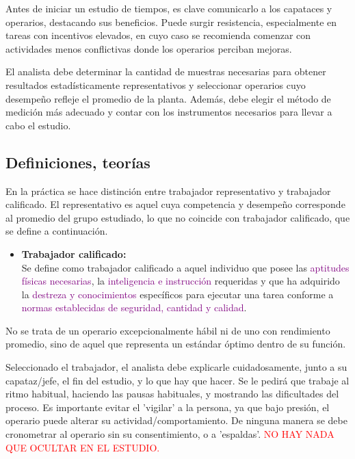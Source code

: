 \documentclass[a4paper,oneside,11pt]{article}
\begin{document}
Antes de iniciar un estudio de tiempos, es clave comunicarlo a los capataces y operarios, destacando sus beneficios. Puede surgir resistencia, especialmente en tareas con incentivos elevados, en cuyo caso se recomienda comenzar con actividades menos conflictivas donde los operarios perciban mejoras.  

El analista debe determinar la cantidad de muestras necesarias para obtener resultados estadísticamente representativos y seleccionar operarios cuyo desempeño refleje el promedio de la planta. Además, debe elegir el método de medición más adecuado y contar con los instrumentos necesarios para llevar a cabo el estudio.

\subsection{Definiciones, teorías}

En la práctica se hace distinción entre trabajador representativo y trabajador calificado. El representativo es aquel cuya competencia y desempeño corresponde al promedio del grupo estudiado, lo que no coincide con trabajador calificado, que se define a continuación.
\begin{itemize}
    \item \textbf{Trabajador calificado:} \\
    Se define como trabajador calificado a aquel individuo que posee las \textcolor{purple}{aptitudes físicas necesarias}, la \textcolor{purple}{inteligencia e instrucción} requeridas y que ha adquirido la \textcolor{purple}{destreza y conocimientos} específicos para ejecutar una tarea conforme a \textcolor{purple}{normas establecidas de seguridad, cantidad y calidad}.  
\end{itemize}


No se trata de un operario excepcionalmente hábil ni de uno con rendimiento promedio, sino de aquel que representa un estándar óptimo dentro de su función.

Seleccionado el trabajador, el analista debe explicarle cuidadosamente, junto a su capataz/jefe, el fin del estudio, y lo que hay que hacer. Se le pedirá que trabaje al ritmo habitual, haciendo las pausas habituales, y mostrando las dificultades del proceso. Es importante evitar el 'vigilar' a la persona, ya que bajo presión, el operario puede alterar su actividad/comportamiento. De ninguna manera se debe cronometrar al operario sin su consentimiento, o a 'espaldas'. \textcolor{red}{NO HAY NADA QUE OCULTAR EN EL ESTUDIO.}
\end{document}
